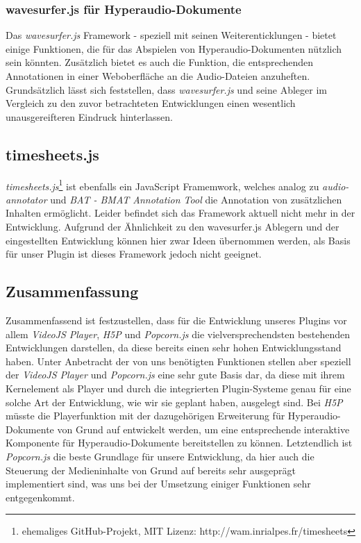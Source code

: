 
\subsubsection{wavesurfer.js für Hyperaudio-Dokumente}
Das \textit{wavesurfer.js} Framework - speziell mit seinen Weiterenticklungen - bietet einige Funktionen, die für das Abspielen von Hyperaudio-Dokumenten nützlich sein könnten. Zusätzlich bietet es auch die Funktion,  die entsprechenden Annotationen in einer Weboberfläche an die Audio-Dateien anzuheften. Grundsätzlich lässt sich feststellen, dass \textit{wavesurfer.js} und seine Ableger im Vergleich zu den zuvor betrachteten Entwicklungen einen wesentlich unausgereifteren Eindruck hinterlassen.

\subsection{timesheets.js}
\textit{timesheets.js}\footnote{ehemaliges GitHub-Projekt, MIT Lizenz: http://wam.inrialpes.fr/timesheets} ist ebenfalls ein JavaScript Framemwork, welches analog zu \textit{audio-annotator} und \textit{BAT - BMAT Annotation Tool} die Annotation von zusätzlichen Inhalten ermöglicht. Leider befindet sich das Framework aktuell nicht mehr in der Entwicklung. Aufgrund der Ähnlichkeit zu den {wavesurfer.js} Ablegern und der eingestellten Entwicklung können hier zwar Ideen übernommen werden, als Basis für unser Plugin ist dieses Framework jedoch nicht geeignet.

\subsection{Zusammenfassung}
Zusammenfassend ist festzustellen, dass für die Entwicklung unseres Plugins vor allem \textit{VideoJS Player}, \textit{H5P} und \textit{Popcorn.js} die vielversprechendsten bestehenden Entwicklungen darstellen, da diese bereits einen sehr hohen Entwicklungsstand haben. Unter Anbetracht der von uns benötigten Funktionen stellen aber speziell der \textit{VideoJS Player} und \textit{Popcorn.js} eine sehr gute Basis dar, da diese mit ihrem Kernelement als Player und durch die integrierten Plugin-Systeme genau für eine solche Art der Entwicklung, wie wir sie geplant haben, ausgelegt sind. Bei \textit{H5P} müsste die Playerfunktion mit der dazugehörigen Erweiterung für Hyperaudio-Dokumente von Grund auf entwickelt werden, um eine entsprechende interaktive Komponente für Hyperaudio-Dokumente bereitstellen zu können. Letztendlich ist \textit{Popcorn.js} die beste Grundlage für unsere Entwicklung, da hier auch die Steuerung der Medieninhalte von Grund auf bereits sehr ausgeprägt implementiert sind, was uns bei der Umsetzung einiger Funktionen sehr entgegenkommt.